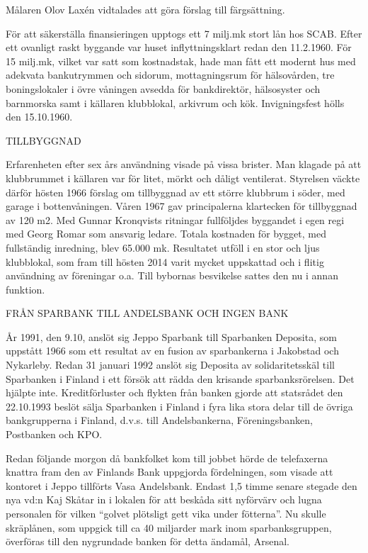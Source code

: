 Målaren Olov Laxén vidtalades att göra förslag till färgsättning.

För att säkerställa finansieringen upptogs ett 7 milj.mk stort lån hos SCAB. Efter ett ovanligt raskt byggande var huset inflyttningsklart redan den 11.2.1960. För 15 milj.mk, vilket var satt som kostnadstak, hade man fått ett modernt hus med adekvata bankutrymmen och sidorum, mottagningsrum för hälsovården, tre boningslokaler i övre våningen avsedda för bankdirektör, hälsosyster och barnmorska samt i källaren klubblokal, arkivrum och kök. Invigningsfest hölls den 15.10.1960.



TILLBYGGNAD

Erfarenheten efter sex års användning visade på vissa brister. Man klagade på att klubbrummet i källaren var för litet, mörkt och dåligt ventilerat. Styrelsen väckte därför hösten 1966 förslag om tillbyggnad av ett större klubbrum i söder, med garage i bottenvåningen. Våren 1967 gav principalerna klartecken för tillbyggnad av 120 m2. Med Gunnar Kronqvists ritningar fullföljdes byggandet i egen regi med Georg Romar som ansvarig ledare. Totala kostnaden för bygget, med fullständig inredning, blev 65.000 mk. Resultatet utföll i en stor och ljus klubblokal, som fram till hösten 2014 varit mycket uppskattad och i flitig användning av föreningar o.a. Till bybornas besvikelse sattes den nu i annan funktion.


FRÅN SPARBANK TILL ANDELSBANK OCH INGEN BANK

År 1991, den 9.10, anslöt sig Jeppo Sparbank till Sparbanken Deposita, som uppstått 1966 som ett resultat av en fusion av sparbankerna i Jakobstad och Nykarleby. Redan 31 januari 1992 anslöt sig Deposita av solidaritetsskäl till Sparbanken i Finland i ett försök att rädda den krisande sparbanksrörelsen. Det hjälpte inte. Kreditförluster och flykten från banken gjorde att statsrådet den 22.10.1993 beslöt sälja Sparbanken i Finland i fyra lika stora delar till de övriga bankgrupperna i Finland, d.v.s. till Andelsbankerna, Föreningsbanken, Postbanken och KPO.

Redan följande morgon då bankfolket kom till jobbet hörde de telefaxerna knattra fram den av Finlands Bank uppgjorda fördelningen, som visade att kontoret i Jeppo tillförts Vasa Andelsbank. Endast 1,5 timme senare stegade den nya vd:n Kaj Skåtar in i lokalen för att beskåda sitt nyförvärv och lugna personalen för vilken ``golvet plötsligt gett vika under fötterna''. Nu skulle skräplånen, som uppgick till ca 40 miljarder mark inom sparbanksgruppen, överföras till den nygrundade banken för detta ändamål, Arsenal.

